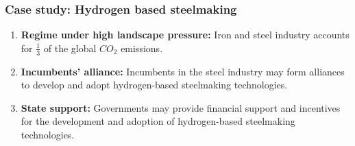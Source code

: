 \documentclass[12pt,a4paper]{article}
\begin{document}
\subsubsection{Case study: Hydrogen based steelmaking}
\begin{enumerate}
    \item \textbf{Regime under high landscape pressure:} Iron and steel industry accounts for $\frac{1}{3}$ of the global $CO_2$ emissions. 
    \item \textbf{Incumbents' alliance:} Incumbents in the steel industry may form alliances to develop and adopt hydrogen-based steelmaking technologies.
    \item \textbf{State support:} Governments may provide financial support and incentives for the development and adoption of hydrogen-based steelmaking technologies.
\end{enumerate}
\end{document}
